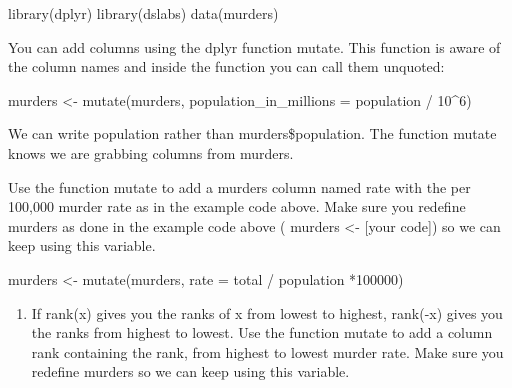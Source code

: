 \documentclass[
]{article}
\newenvironment{Shaded}{\begin{snugshade}}{\end{snugshade}}
\newcommand{\AttributeTok}[1]{\textcolor[rgb]{0.77,0.63,0.00}{#1}}
\newcommand{\DecValTok}[1]{\textcolor[rgb]{0.00,0.00,0.81}{#1}}
\newcommand{\FunctionTok}[1]{\textcolor[rgb]{0.00,0.00,0.00}{#1}}
\newcommand{\NormalTok}[1]{#1}
\newcommand{\OtherTok}[1]{\textcolor[rgb]{0.56,0.35,0.01}{#1}}
\newcommand{\SpecialCharTok}[1]{\textcolor[rgb]{0.00,0.00,0.00}{#1}}
\providecommand{\tightlist}{%
  \setlength{\itemsep}{0pt}\setlength{\parskip}{0pt}}
\begin{document}
\begin{Shaded}
\begin{Highlighting}[]
\FunctionTok{library}\NormalTok{(dplyr)}
\FunctionTok{library}\NormalTok{(dslabs)}
\FunctionTok{data}\NormalTok{(murders)}
\end{Highlighting}
\end{Shaded}

You can add columns using the dplyr function mutate. This function is
aware of the column names and inside the function you can call them
unquoted:

\begin{Shaded}
\begin{Highlighting}[]
\NormalTok{murders }\OtherTok{\textless{}{-}} \FunctionTok{mutate}\NormalTok{(murders, }\AttributeTok{population\_in\_millions =}\NormalTok{ population }\SpecialCharTok{/} \DecValTok{10}\SpecialCharTok{\^{}}\DecValTok{6}\NormalTok{)}
\end{Highlighting}
\end{Shaded}

We can write population rather than murders\$population. The function
mutate knows we are grabbing columns from murders.

Use the function mutate to add a murders column named rate with the per
100,000 murder rate as in the example code above. Make sure you redefine
murders as done in the example code above ( murders \textless- {[}your
code{]}) so we can keep using this variable.

\begin{Shaded}
\begin{Highlighting}[]
\NormalTok{murders }\OtherTok{\textless{}{-}} \FunctionTok{mutate}\NormalTok{(murders, }\AttributeTok{rate =}\NormalTok{ total }\SpecialCharTok{/}\NormalTok{ population }\SpecialCharTok{*}\DecValTok{100000}\NormalTok{)}
\end{Highlighting}
\end{Shaded}

\begin{enumerate}
\def\labelenumi{\arabic{enumi}.}
\setcounter{enumi}{1}
\tightlist
\item
  If rank(x) gives you the ranks of x from lowest to highest, rank(-x)
  gives you the ranks from highest to lowest. Use the function mutate to
  add a column rank containing the rank, from highest to lowest murder
  rate. Make sure you redefine murders so we can keep using this
  variable.
\end{enumerate}
\end{document}
